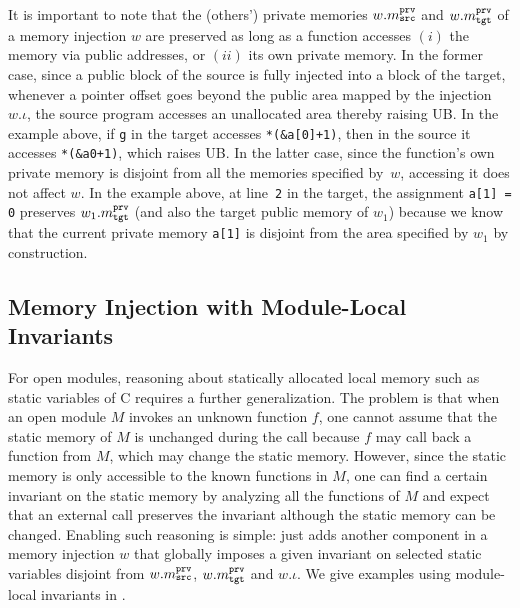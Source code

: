 {It is important to note that the (others') private memories $w.m^{\texttt{prv}}_{\texttt{src}}$ and $w.m^{\texttt{prv}}_{\texttt{tgt}}$ of a
memory injection $w$ are preserved as long as a function accesses
$(i)$ the memory via public addresses, or $(ii)$ its own private memory.
In the former case,
since a public block of the source is fully injected into a block of the target,
whenever a pointer offset goes beyond the public area mapped by the injection $w.\iota$,
the source program accesses an unallocated area thereby raising UB.
In the example above, if \texttt{g} in the target accesses \texttt{*(\&a[0]+1)},
then in the source it accesses \texttt{*(\&a0+1)}, which raises UB.
In the latter case, since the function's own private memory
is disjoint from all the memories specified by~$w$,
accessing it does not affect $w$. In the example above, at line~\texttt{2} in the target, 
the assignment \texttt{a[1] = 0} preserves $w_1.m^{\texttt{prv}}_{\texttt{tgt}}$ (and also the target public memory of $w_1$) because we know that
the current private memory \texttt{a[1]} is disjoint from the area specified by $w_1$ by construction.



\subsection{Memory Injection with Module-Local Invariants}
\label{sec:overview-verification:injection:static}
%
For open modules, reasoning about statically allocated local memory
such as static variables of C requires a further generalization.  The
problem is that when an open module $M$ invokes an unknown function
$f$, one cannot assume that the static memory of $M$ is unchanged
during the call because $f$ may call back a function from $M$, which
may change the static memory. However, since the static memory is only
accessible to the known functions in $M$, one can find a certain
invariant on the static memory by analyzing all the functions of $M$
and expect that an external call preserves the invariant although the
static memory can be changed. Enabling such reasoning is simple:
\ccm{} just adds another component in a memory injection $w$ that
globally imposes a given invariant on selected static variables
disjoint from $w.m^{\texttt{prv}}_{\texttt{src}}$, $w.m^{\texttt{prv}}_{\texttt{tgt}}$ and $w.\iota$.
We give examples using module-local invariants in .
}

